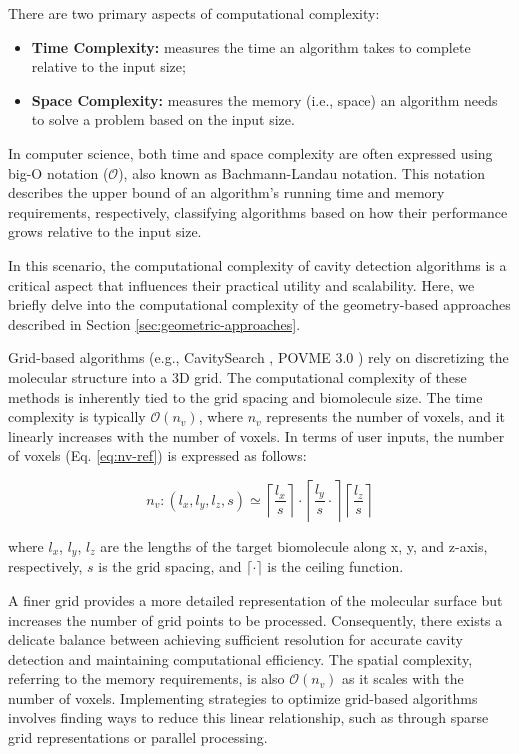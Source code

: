 \documentclass[Ingles]{phdthesis}
\def\ie{i.e.\onedot}
\def\eg{e.g.\onedot}
\begin{document}
There are two primary aspects of computational complexity:

\begin{itemize}
  \item \textbf{Time Complexity:} measures the time an algorithm takes to complete relative to the input size;
  \item \textbf{Space Complexity:} measures the memory (\ie, space) an algorithm needs to solve a problem based on the input size.
\end{itemize}

In computer science, both time and space complexity are often expressed using big-O notation ($\mathcal{O}$), also known as Bachmann-Landau notation. This notation describes the upper bound of an algorithm's running time and memory requirements, respectively, classifying algorithms based on how their performance grows relative to the input size.

In this scenario, the computational complexity of cavity detection algorithms is a
critical aspect that influences their practical utility and scalability. Here, we briefly delve into the computational complexity of the geometry-based approaches described in Section \ref{sec:geometric-approaches}.

Grid-based algorithms (\eg, CavitySearch \cite{cavitysearch}, POVME 3.0 \cite{povme}) rely on discretizing the molecular structure into a \acs{3D} grid. The computational complexity of these methods is inherently tied to the grid spacing and biomolecule size. The time complexity is typically $\mathcal{O}(n_{v})$, where $n_{v}$ represents the number of voxels, and it linearly increases with the number of voxels. In terms of user inputs, the number of voxels (Eq. \ref{eq:nv-ref}) is expressed as follows:

\begin{equation}
  n_v \colon (l_x,l_y,l_z,s) \simeq \left \lceil \frac{l_x}{s} \right \rceil \cdot \left \lceil \frac{l_y}{s} \cdot \right \rceil \left \lceil \frac{l_z}{s} \right \rceil
  \label{eq:nv-ref}
\end{equation}

\noindent where $l_x$, $l_y$, $l_z$ are the lengths of the target biomolecule along x, y, and z-axis, respectively, $s$ is the grid spacing, and $\lceil \cdot \rceil$ is the ceiling function.

A finer grid provides a more detailed representation of the molecular surface but increases the number of grid points to be processed. Consequently, there exists a delicate balance between achieving sufficient resolution for accurate cavity detection and maintaining computational efficiency. The spatial complexity, referring to the memory requirements, is also $\mathcal{O}(n_{v})$ as it scales with the number of voxels. Implementing strategies to optimize grid-based algorithms involves finding ways to reduce this linear relationship, such as through sparse grid representations or parallel processing.
\end{document}
